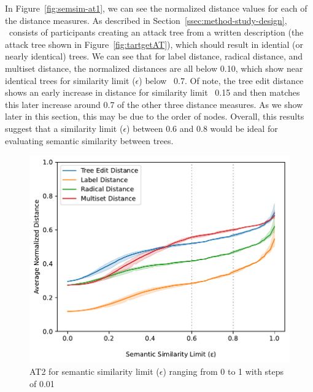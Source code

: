 In Figure~\ref{fig:semsim-at1}, we can see the normalized distance values for each of the distance measures. As described in Section~\ref{ssec:method-study-design}, \ATone\ consists of participants creating an attack tree from a written description (the attack tree shown in Figure~\ref{fig:tartgetAT}), which should result in idential (or nearly identical) trees. We can see that for label distance, radical distance, and multiset distance, the normalized distances are all below 0.10, which show near identical trees for similarity limit ($\epsilon$) below ~0.7. Of note, the tree edit distance shows an early increase in distance for similarity limit ~0.15 and then matches this later increase around 0.7 of the other three distance measures. As we show later in this section, this may be due to the order of nodes. Overall, this results suggest that a similarity limit ($\epsilon$) between 0.6 and 0.8 would be ideal for evaluating semantic similarity between trees.

\begin{figure}
    \includegraphics[width=\linewidth]{code/img/similaritylimits_at2_percentage.pdf}
    \caption{AT2 for semantic similarity limit ($\epsilon$) ranging from 0 to 1 with steps of 0.01}
    \label{fig:semsim-at2}
\end{figure}



